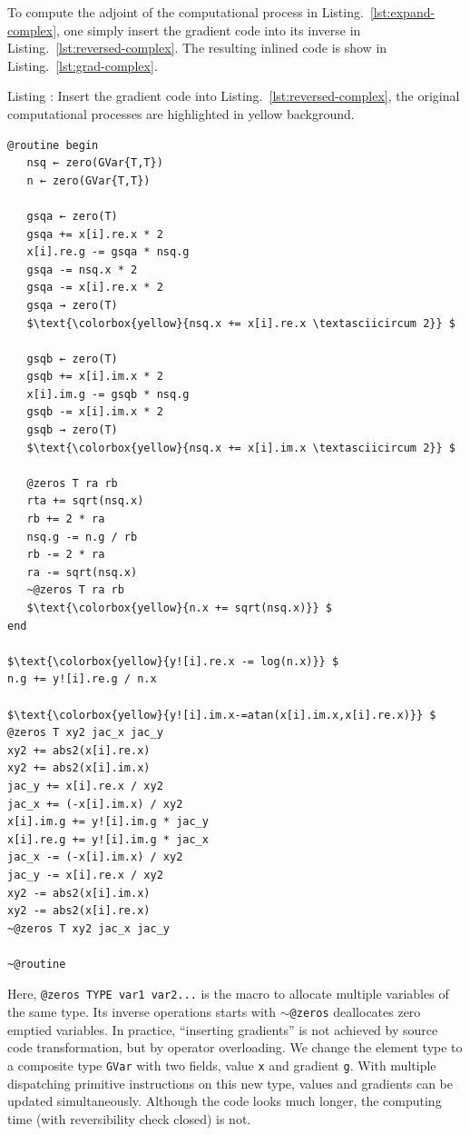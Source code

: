 \documentclass{article}
\newcommand{\listingcaption}[1]%
{%
\refstepcounter{lstlisting}\hfill%
Listing \thelstlisting: #1\hfill%
}%
\let\oldsim\sim
\renewcommand{\sim}{{\oldsim}}
\newcommand{\<}{\langle}
\renewcommand{\>}{\rangle}
\newcommand{\Lst}[1]{Listing.~\ref{#1}}
\theoremstyle{definition}\newtheorem{definition}{\textit{Definition}}
\begin{document}
To compute the adjoint of the computational process in \Lst{lst:expand-complex}, one simply insert the gradient code into its inverse in \Lst{lst:reversed-complex}.
The resulting inlined code is show in \Lst{lst:grad-complex}.

\begin{minipage}{.88\columnwidth}
\listingcaption{Insert the gradient code into \Lst{lst:reversed-complex}, the original computational processes are highlighted in yellow background.}\label{lst:grad-complex}
\begin{lstlisting}[mathescape=true,label={lst:grad-complex}, multicols=2]
@routine begin
   nsq ← zero(GVar{T,T})
   n ← zero(GVar{T,T})

   gsqa ← zero(T)
   gsqa += x[i].re.x * 2
   x[i].re.g -= gsqa * nsq.g
   gsqa -= nsq.x * 2
   gsqa -= x[i].re.x * 2
   gsqa → zero(T)
   $\text{\colorbox{yellow}{nsq.x += x[i].re.x \textasciicircum 2}} $

   gsqb ← zero(T)
   gsqb += x[i].im.x * 2
   x[i].im.g -= gsqb * nsq.g
   gsqb -= x[i].im.x * 2
   gsqb → zero(T)
   $\text{\colorbox{yellow}{nsq.x += x[i].im.x \textasciicircum 2}} $

   @zeros T ra rb
   rta += sqrt(nsq.x)
   rb += 2 * ra
   nsq.g -= n.g / rb
   rb -= 2 * ra
   ra -= sqrt(nsq.x)
   ~@zeros T ra rb
   $\text{\colorbox{yellow}{n.x += sqrt(nsq.x)}} $
end

$\text{\colorbox{yellow}{y![i].re.x -= log(n.x)}} $
n.g += y![i].re.g / n.x

$\text{\colorbox{yellow}{y![i].im.x-=atan(x[i].im.x,x[i].re.x)}} $
@zeros T xy2 jac_x jac_y
xy2 += abs2(x[i].re.x)
xy2 += abs2(x[i].im.x)
jac_y += x[i].re.x / xy2
jac_x += (-x[i].im.x) / xy2
x[i].im.g += y![i].im.g * jac_y
x[i].re.g += y![i].im.g * jac_x
jac_x -= (-x[i].im.x) / xy2
jac_y -= x[i].re.x / xy2
xy2 -= abs2(x[i].im.x)
xy2 -= abs2(x[i].re.x)
~@zeros T xy2 jac_x jac_y

~@routine
\end{lstlisting}
\end{minipage}

Here, \texttt{@zeros TYPE var1 var2...} is the macro to allocate multiple variables of the same type. Its inverse operations starts with \texttt{$\sim$@zeros} deallocates zero emptied variables.
In practice, ``inserting gradients'' is not achieved by source code transformation, but by operator overloading. We change the element type to a composite type \texttt{GVar} with two fields, value \texttt{x} and gradient \texttt{g}.
With multiple dispatching primitive instructions on this new type, values and gradients can be updated simultaneously.
Although the code looks much longer, the computing time (with reversibility check closed) is not.
\end{document}
